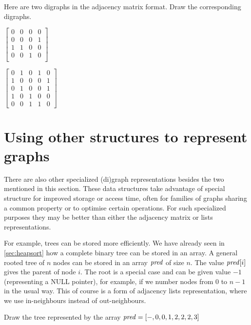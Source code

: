 \begin{Boxample}[2]
Here are two digraphs in the adjacency matrix format. Draw the corresponding digraphs.

\vspace{1.5cm}
$\left[
\begin{matrix}
0 & 0 & 0 & 0  \\
0 & 0 & 0 & 1  \\
1 & 1 & 0 & 0  \\
0 & 0 & 1 & 0  \\
\end{matrix}
\right]$

\vspace{2.5cm}
$\left[
\begin{matrix}
0 & 1 & 0 & 1 & 0 \\
1 & 0 & 0 & 0 & 1 \\
0 & 1 & 0 & 0 & 1 \\
1 & 0 & 1 & 0 & 0 \\
0 & 0 & 1 & 1 & 0 
\end{matrix}
\right]$

\end{Boxample}


\section{Using other structures to represent graphs}

There are also other specialized (di)graph representations besides the
two mentioned in this section.  These data structures take advantage of
special structure for improved storage or access time, often for
families of graphs sharing a common property or to optimise certain operations. For such specialized
purposes they may be better than either the adjacency matrix or lists
representations.

For example, trees can be stored more efficiently. We have already
seen in \cref{sec:heapsort} how a complete binary tree can be
stored in an array. A general rooted tree of $n$ nodes can be stored in
an array $\operatorname{\text{\textit{pred}}}$ of size $n$. The value $\operatorname{\text{\textit{pred}}}[i]$ gives the parent of
node $i$. The root is a special case and can be given value $-1$
(representing a NULL pointer), for example, if we number nodes from $0$
to $n-1$ in the usual way. This of course is a form of adjacency lists
representation, where we use in-neighbours instead of out-neighbours.

\begin{Boxample}[4]
Draw the tree represented by the array $\operatorname{\text{\textit{pred}}} = [-,0,0,1,2,2,2,3]$
\end{Boxample}

